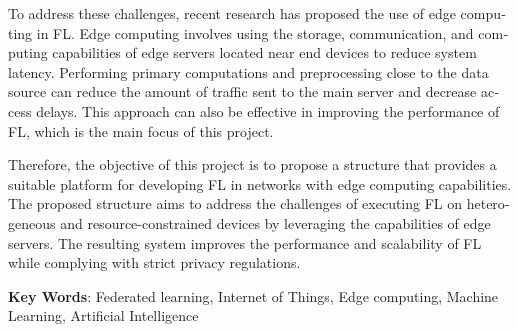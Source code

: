 \begin{latin}
\begin{small}
To address these challenges, recent research has proposed the use of edge computing in FL. Edge computing involves using the storage, communication, and computing capabilities of edge servers located near end devices to reduce system latency. Performing primary computations and preprocessing close to the data source can reduce the amount of traffic sent to the main server and decrease access delays. This approach can also be effective in improving the performance of FL, which is the main focus of this project.

Therefore, the objective of this project is to propose a structure that provides a suitable platform for developing FL in networks with edge computing capabilities. The proposed structure aims to address the challenges of executing FL on heterogeneous and resource-constrained devices by leveraging the capabilities of edge servers. The resulting system improves the performance and scalability of FL while complying with strict privacy regulations.

\end{small}

\vspace{0.5 cm}

\noindent \textbf{Key Words}: Federated learning, Internet of Things, Edge computing, Machine Learning, Artificial Intelligence

\end{latin}